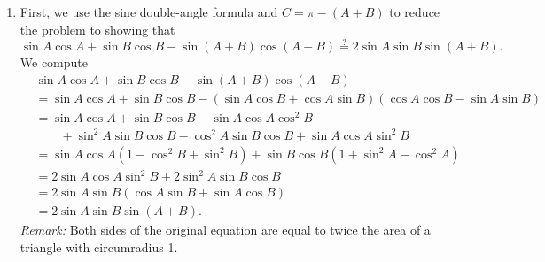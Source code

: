 \begin{enumerate}
\begin{enumerate}
\item First, we use the sine double-angle formula and $C = \pi - (A + B)$ to reduce the problem to showing that 
\begin{equation*}
\sin A\cos A + \sin B\cos B - \sin(A + B)\cos(A + B)\stackrel{?}{=} 2\sin A\sin B\sin(A + B).
\end{equation*}
We compute
\begin{align*}
& \sin A\cos A + \sin B\cos B - \sin(A + B)\cos(A + B) \\
&= \sin A\cos A + \sin B\cos B - (\sin A\cos B + \cos A\sin B)(\cos A\cos B - \sin A\sin B) \\
&= \sin A\cos A + \sin B\cos B - \sin A\cos A\cos^2 B \\
&\qquad + \sin^2 A\sin B\cos B - \cos^2 A\sin B\cos B + \sin A\cos A\sin^2 B \\
&= \sin A\cos A(1 - \cos^2 B + \sin^2 B) + \sin B\cos B(1 + \sin^2 A - \cos^2 A) \\
&= 2\sin A\cos A\sin^2 B + 2\sin^2 A\sin B\cos B \\
&= 2\sin A\sin B(\cos A\sin B + \sin A\cos B) \\
&= 2\sin A\sin B\sin(A + B).
\end{align*}
\emph{Remark:} Both sides of the original equation are equal to twice the area of a triangle with circumradius 1.
\end{enumerate}
\end{enumerate}